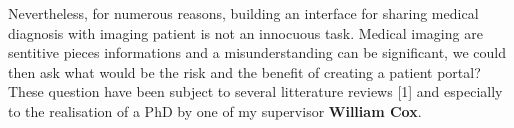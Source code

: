\newline \vspace{5mm}
Nevertheless, for numerous reasons, building an interface for sharing medical diagnosis with imaging patient is not an innocuous task. Medical imaging are sentitive pieces informations and a misunderstanding can be significant, we could then ask what would be the risk and the benefit of creating a patient portal? These question have been subject to several litterature reviews [1] and especially to the realisation of a PhD by one of my supervisor \textbf{William Cox}.
